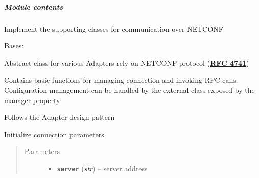 \documentclass[letterpaper,10pt,english]{sphinxmanual}
\begin{document}
\subparagraph{Module contents}
\label{util/netconf:module-contents}\label{util/netconf:module-escape.util.netconf}
Implement the supporting classes for communication over NETCONF

\begin{fulllineitems}
\label{util/netconf:escape.util.netconf.AbstractNETCONFAdapter}
Bases: \href{https://docs.python.org/2.7/library/functions.html\#object}{}

Abstract class for various Adapters rely on NETCONF protocol (\href{https://tools.ietf.org/html/rfc4741.html}{\textbf{RFC 4741}})

Contains basic functions for managing connection and invoking RPC calls.
Configuration management can be handled by the external
\href{http://ncclient.readthedocs.org/en/latest/manager.html\#ncclient.manager.Manager}{} class exposed by the manager property

Follows the Adapter design pattern

\begin{fulllineitems}
\label{util/netconf:escape.util.netconf.AbstractNETCONFAdapter.NETCONF_NAMESPACE}
\end{fulllineitems}


\begin{fulllineitems}
\label{util/netconf:escape.util.netconf.AbstractNETCONFAdapter.RPC_NAMESPACE}
\end{fulllineitems}


\begin{fulllineitems}
\label{util/netconf:escape.util.netconf.AbstractNETCONFAdapter.__init__}
Initialize connection parameters
\begin{quote}\begin{description}
\item[{Parameters}] \leavevmode\begin{itemize}
\item {} 
\textbf{\texttt{server}} (\href{https://docs.python.org/2.7/library/functions.html\#str}{\emph{str}}) -- server address


\end{itemize}
\end{description}
\end{quote}
\end{fulllineitems}
\end{fulllineitems}
\end{document}
